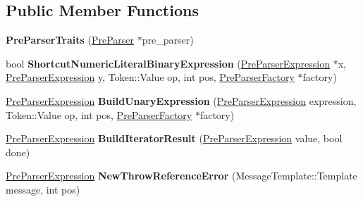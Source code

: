 \subsection*{Public Member Functions}
\begin{DoxyCompactItemize}
\item 
{\bfseries Pre\+Parser\+Traits} (\hyperlink{classv8_1_1internal_1_1_pre_parser}{Pre\+Parser} $\ast$pre\+\_\+parser)\hypertarget{classv8_1_1internal_1_1_pre_parser_traits_a9a1be2b87e3ebd1a07da40f4f1b475c6}{}\label{classv8_1_1internal_1_1_pre_parser_traits_a9a1be2b87e3ebd1a07da40f4f1b475c6}

\item 
bool {\bfseries Shortcut\+Numeric\+Literal\+Binary\+Expression} (\hyperlink{classv8_1_1internal_1_1_pre_parser_expression}{Pre\+Parser\+Expression} $\ast$x, \hyperlink{classv8_1_1internal_1_1_pre_parser_expression}{Pre\+Parser\+Expression} y, Token\+::\+Value op, int pos, \hyperlink{classv8_1_1internal_1_1_pre_parser_factory}{Pre\+Parser\+Factory} $\ast$factory)\hypertarget{classv8_1_1internal_1_1_pre_parser_traits_a57a3afb92d382d46fceffbf0ba64e75c}{}\label{classv8_1_1internal_1_1_pre_parser_traits_a57a3afb92d382d46fceffbf0ba64e75c}

\item 
\hyperlink{classv8_1_1internal_1_1_pre_parser_expression}{Pre\+Parser\+Expression} {\bfseries Build\+Unary\+Expression} (\hyperlink{classv8_1_1internal_1_1_pre_parser_expression}{Pre\+Parser\+Expression} expression, Token\+::\+Value op, int pos, \hyperlink{classv8_1_1internal_1_1_pre_parser_factory}{Pre\+Parser\+Factory} $\ast$factory)\hypertarget{classv8_1_1internal_1_1_pre_parser_traits_abe09fcdfe8b1fa21bb07d64d7cb022cb}{}\label{classv8_1_1internal_1_1_pre_parser_traits_abe09fcdfe8b1fa21bb07d64d7cb022cb}

\item 
\hyperlink{classv8_1_1internal_1_1_pre_parser_expression}{Pre\+Parser\+Expression} {\bfseries Build\+Iterator\+Result} (\hyperlink{classv8_1_1internal_1_1_pre_parser_expression}{Pre\+Parser\+Expression} value, bool done)\hypertarget{classv8_1_1internal_1_1_pre_parser_traits_acbd15a9435735f57fb49335850c837ea}{}\label{classv8_1_1internal_1_1_pre_parser_traits_acbd15a9435735f57fb49335850c837ea}

\item 
\hyperlink{classv8_1_1internal_1_1_pre_parser_expression}{Pre\+Parser\+Expression} {\bfseries New\+Throw\+Reference\+Error} (Message\+Template\+::\+Template message, int pos)\hypertarget{classv8_1_1internal_1_1_pre_parser_traits_a639d919bb24ef626bfd8e70c6b489b70}{}\label{classv8_1_1internal_1_1_pre_parser_traits_a639d919bb24ef626bfd8e70c6b489b70}


\end{DoxyCompactItemize}
